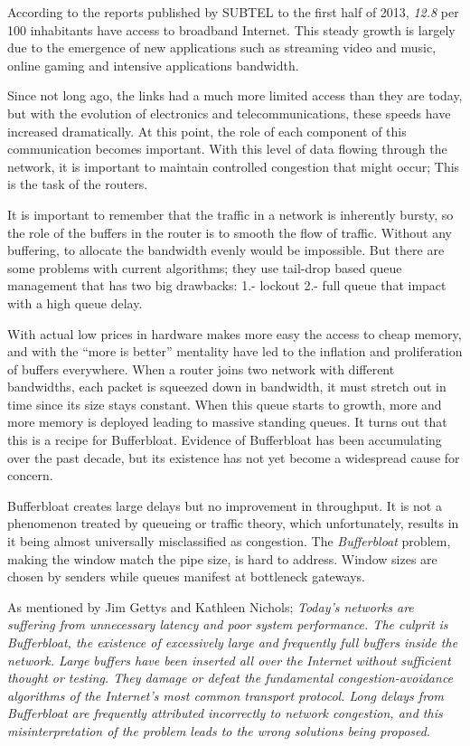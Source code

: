 According to the reports published by SUBTEL to the first half of 2013,
\textit{12.8} per 100 inhabitants have access to broadband
Internet\cite{OCDE}.  This steady growth is largely due to the emergence of
new applications such as streaming video and music, online gaming and
intensive applications bandwidth.

Since not long ago, the links had a much more limited access than they are
today, but with the evolution of electronics and telecommunications, these
speeds have increased dramatically. At this point, the role of each component
of this communication becomes important. With this level of data flowing
through the network, it is important to maintain controlled congestion that
might occur; This is the task of the routers.

It is important to remember that the traffic in a network is inherently
bursty, so the role of the buffers in the router is to smooth the flow of
traffic. Without any buffering, to allocate the bandwidth evenly would be
impossible. But there are some problems with current algorithms; they use
tail-drop based queue management that has two big drawbacks: 1.- lockout 2.-
full queue that impact with a high queue delay.

With actual low prices in hardware makes more easy the access to cheap memory,
and with the ``more is better'' mentality have led to the inflation and
proliferation of buffers everywhere\cite{NicholsJacobsonCQD}. When a router
joins two network with different bandwidths, each packet is squeezed down in
bandwidth, it must stretch out in time since its size stays constant. When
this queue starts to growth, more and more memory is deployed leading to
massive standing queues. It turns out that this is a recipe for Bufferbloat.
Evidence of Bufferbloat has been accumulating over the past decade, but its
existence has not yet become a widespread cause for concern.

Bufferbloat creates large delays but no improvement in throughput. It is not a
phenomenon treated by queueing or traffic theory, which unfortunately, results
in it being almost universally misclassified as congestion. The \textit{\gls{Bufferbloat}}
problem, making the window match the pipe size, is hard to address. Window
sizes are chosen by senders while queues manifest at bottleneck gateways.


As mentioned by Jim Gettys and Kathleen Nichols;
\textit{Today's networks are suffering from unnecessary latency and poor
system performance. The culprit is Bufferbloat, the existence of excessively
large and frequently full buffers inside the network. Large buffers have been
inserted all over the Internet without sufficient thought or testing. They
damage or defeat the fundamental congestion-avoidance algorithms of the
Internet's most common transport protocol. Long delays from Bufferbloat are
frequently attributed incorrectly to network congestion, and this
misinterpretation of the problem leads to the wrong solutions being
proposed}\cite{GettysNichols}.

